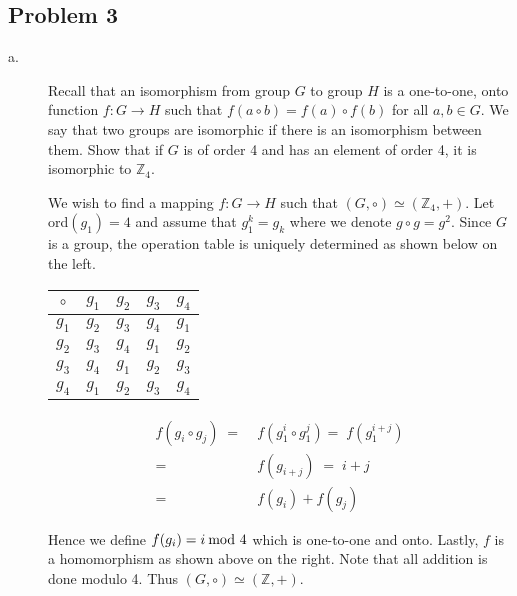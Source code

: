 \documentclass[../hw_sols.tex]{subfiles}
\begin{document}
\subsection*{Problem 3}

\begin{description}

\item[a.] Recall that an isomorphism from group $G$ to group $H$ is a 
one-to-one, onto function $f : G \to H$ such that 
$f(a \circ b) = f(a) \circ f(b)$ for all $a, b \in G$. We say that two groups 
are isomorphic if there is an isomorphism between them. Show that if $G$ is 
of order 4 and has an element of order 4, it is isomorphic to $\mathbb{Z}_4$.

\begin{solution}

We wish to find a mapping $f: G \to H$ such that 
$(G, \circ) \simeq (\mathbb{Z}_4,+)$. Let ord$(g_1) = 4$ and assume that 
$g_1^k = g_k$ where we denote $g \circ g = g^2$. Since $G$ is a group, the 
operation table is uniquely determined as shown below on the left.

\begin{multicols}{2}
\begin{center}
\begin{tabular}{ c | c | c | c | c }
	$\circ$ & $g_1$ & $g_2$ & $g_3$ & $g_4$ \\
	\hline
	  $g_1$ & $g_2$ & $g_3$ & $g_4$ & $g_1$ \\
	\hline
	  $g_2$ & $g_3$ & $g_4$ & $g_1$ & $g_2$ \\
	\hline
	  $g_3$ & $g_4$ & $g_1$ & $g_2$ & $g_3$ \\
	\hline
	  $g_4$ & $g_1$ & $g_2$ & $g_3$ & $g_4$
\end{tabular}
\end{center}

\noindent
\begin{align*}
	f(g_i \circ g_j) \; 
	=& \; f(g_1^i \circ g_1^j) = \; f(g_1^{i+j}) \\
	=& \; f(g_{i+j}) \; = \; i + j \\
	=& \; f(g_i) + f(g_j)
\end{align*}
\end{multicols}

Hence we define $f(g_i) = i \tmod{4}$ which is one-to-one and onto. Lastly, 
$f$ is a homomorphism as shown above on the right. Note that all addition is 
done modulo 4. Thus $(G, \circ) \simeq (\mathbb{Z},+)$.


\end{solution}
\end{description}
\end{document}
